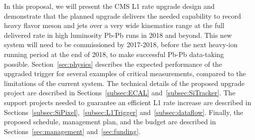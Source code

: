 In this proposal, we will present the CMS L1 rate upgrade design and demonstrate that the planned upgrade delivers the needed capability to record heavy flavor meson and jets over a very wide kinematics range at the full delivered rate in high luminosity Pb-Pb runs in 2018 and beyond. This new system will need to be commissioned by 2017-2018, before the next heavy-ion running period at the end of 2018, to make successful Pb-Pb data-taking possible. Section~\ref{sec:physics} describes the expected performance of the upgraded trigger for several examples of critical measurements, compared to the limitations of the current system. The technical details of the proposed upgrade project are described in Sections~\ref{subsec:ECAL} and~\ref{subsec:SiTracker}. The support projects needed to guarantee an efficient L1 rate increase are described in Sections~\ref{subsec:SiPixel},~\ref{subsec:L1Trigger} and~\ref{subsec:dataflow}. Finally, the proposed schedule, management plan, and the budget are described in Sections~\ref{sec:management} and~\ref{sec:funding}.

